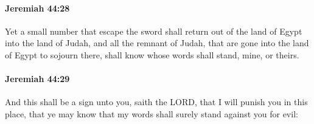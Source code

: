 		\paragraph{Jeremiah 44:28} %
			\label{JEREMIAH-44-28}

			Yet a small number that escape the sword shall return out of the land of Egypt into the land of Judah, and all the remnant of Judah, that are gone into the land of Egypt to sojourn there, shall know whose words shall stand, mine, or theirs.


		\paragraph{Jeremiah 44:29} %
			\label{JEREMIAH-44-29}

			And this shall be a sign unto you, saith the LORD, that I will punish you in this place, that ye may know that my words shall surely stand against you for evil:


